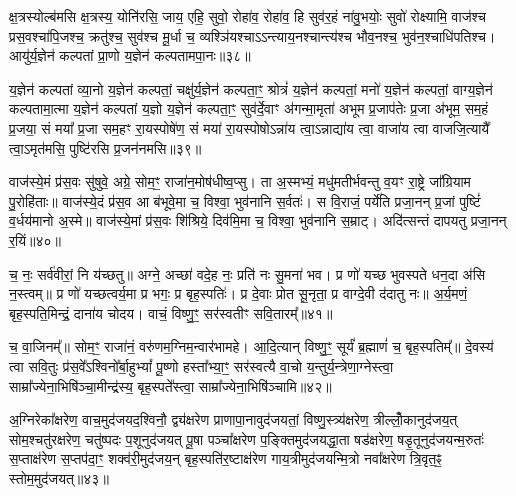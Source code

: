 {\anuvakamend[{स्क॒भ्नी॒त॒ यु॒य॒व॒न्पि॒तरा॒ द्विच॑त्वारिꣳशच्च॥८॥}]}

क्ष॒त्रस्योल्ब॑मसि क्ष॒त्रस्य॒ योनि॑रसि॒ जाय॒ एहि॒ सुवो॒ रोहा॑व॒ रोहा॑व॒ हि सुव॑र॒हं ना॑वु॒भयोः॒ सुवो॑ रोक्ष्यामि॒ वाज॑श्च प्रस॒वश्चा॑पि॒जश्च॒ क्रतु॑श्च॒ सुव॑श्च मू॒र्धा च॒ व्यश्ञि॑यश्चा\-ऽ\-ऽन्त्याय॒नश्चान्त्य॑श्च भौव॒नश्च॒ भुव॑न॒श्चाधि॑पतिश्च। आयु॑र्य॒ज्ञेन॑ कल्पतां प्रा॒णो य॒ज्ञेन॑ कल्पतामपा॒नः॥३८॥

य॒ज्ञेन॑ कल्पतां व्या॒नो य॒ज्ञेन॑ कल्पतां॒ चक्षु॑र्य॒ज्ञेन॑ कल्पता॒ꣳ॒ श्रोत्रं॑ य॒ज्ञेन॑ कल्पतां॒ मनो॑ य॒ज्ञेन॑ कल्पतां॒ वाग्य॒ज्ञेन॑ कल्पतामा॒त्मा य॒ज्ञेन॑ कल्पतां य॒ज्ञो य॒ज्ञेन॑ कल्पता॒ꣳ॒ सुव॑र्दे॒वाꣳ अ॑गन्मा॒मृता॑ अभूम प्र॒जाप॑तेः प्र॒जा अ॑भूम॒ सम॒हं प्र॒जया॒ सं मया᳚ प्र॒जा सम॒हꣳ रा॒यस्पोषे॑ण॒ सं मया॑ रा॒यस्पोषो\-ऽन्ना॑य त्वा॒\-ऽन्नाद्या॑य त्वा॒ वाजा॑य त्वा वाजजि॒त्यायै᳚ त्वा॒\-ऽमृत॑मसि॒ पुष्टि॑रसि प्र॒जन॑नमसि॥३९॥

{\anuvakamend[{अ॒पा॒नो वाजा॑य॒ नव॑ च॥९॥}]}

वाज॑स्ये॒मं प्र॑स॒वः सु॑षुवे॒ अग्रे॒ सोम॒ꣳ॒ राजा॑न॒मोष॑धीष्व॒प्सु। ता अ॒स्मभ्यं॒ मधु॑मतीर्भवन्तु व॒यꣳ रा॒ष्ट्रे जा᳚ग्रियाम पु॒रोहि॑ताः॥ वाज॑स्ये॒दं प्र॑स॒व आ ब॑भूवे॒मा च॒ विश्वा॒ भुव॑नानि स॒र्वतः॑। स वि॒राजं॒ पर्ये॑ति प्रजा॒नन् प्र॒जां पुष्टिं॑ व॒र्धय॑मानो अ॒स्मे॥ वाज॑स्ये॒मां प्र॑स॒वः शि॑श्रिये॒ दिव॑मि॒मा च॒ विश्वा॒ भुव॑नानि स॒म्राट्। अदि॑त्सन्तं दापयतु प्रजा॒नन् र॒यिं॥४०॥

च॒ नः॒ सर्व॑वीरां॒ नि य॑च्छतु॥ अग्ने॒ अच्छा॑ वदे॒ह नः॒ प्रति॑ नः सु॒मना॑ भव। प्र णो॑ यच्छ भुवस्पते धन॒दा अ॑सि न॒स्त्वम्॥ प्र णो॑ यच्छत्वर्य॒मा प्र भगः॒ प्र बृह॒स्पतिः॑। प्र दे॒वाः प्रोत सू॒नृता॒ प्र वाग्दे॒वी द॑दातु नः॥ अ॒र्य॒मणं॒ बृह॒स्पति॒मिन्द्रं॒ दाना॑य चोदय। वाचं॒ विष्णु॒ꣳ॒ सर॑स्वतीꣳ सवि॒तारम्᳚॥४१॥

च॒ वा॒जिनम्᳚॥ सोम॒ꣳ॒ राजा॑नं॒ वरु॑णम॒ग्निम॒न्वार॑भामहे। आ॒दि॒त्यान् विष्णु॒ꣳ॒ सूर्यं॑ ब्र॒ह्माणं॑ च॒ बृह॒स्पतिम्᳚॥ दे॒वस्य॑ त्वा सवि॒तुः प्र॑स॒वे᳚\-ऽश्विनो᳚र्बा॒हु\-भ्यां᳚ पू॒ष्णो हस्ता᳚भ्या॒ꣳ॒ सर॑स्वत्यै वा॒चो य॒न्तुर्य॒न्त्रेणा॒ग्नेस्त्वा॒ साम्रा᳚ज्येना॒भिषि॑ञ्चा॒मीन्द्र॑स्य॒ बृह॒स्पते᳚स्त्वा॒ साम्रा᳚ज्येना॒भिषि॑ञ्चामि॥४२॥

{\anuvakamend[{र॒यिꣳ स॑वि॒तार॒ꣳ॒ षट्त्रिꣳ॑शच्च॥10॥}]}

अ॒ग्निरेका᳚क्षरेण॒ वाच॒मुद॑जयद॒श्विनौ॒ द्व्य॑क्षरेण प्राणापा॒नावुद॑जयतां॒ विष्णु॒स्त्र्य॑क्षरेण॒ त्रील्लोँ॒कानुद॑जय॒त् सोम॒श्चतु॑रक्षरेण॒ चतु॑ष्पदः प॒शूनुद॑जयत् पू॒षा पञ्चा᳚क्षरेण प॒ङ्क्तिमुद॑जयद्धा॒ता षड॑क्षरेण॒ षडृ॒तूनुद॑जयन्म॒रुतः॑ स॒प्ताक्ष॑रेण स॒प्तप॑दा॒ꣳ॒ शक्व॑री॒मुद॑जय॒न् बृह॒स्पति॑र॒ष्टाक्ष॑रेण गाय॒त्रीमुद॑जयन्मि॒त्रो नवा᳚क्षरेण त्रि॒वृत॒ꣴ॒ स्तोम॒मुद॑जयत्॥४३॥

